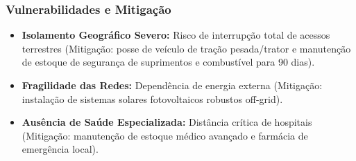 \subsubsection{Vulnerabilidades e
Mitigação}

\begin{itemize}
\tightlist
\item
  \textbf{Isolamento Geográfico Severo:} Risco de interrupção total de
  acessos terrestres (Mitigação: posse de veículo de tração
  pesada/\allowbreak trator e manutenção de estoque de segurança de suprimentos e
  combustível para 90 dias).
\item
  \textbf{Fragilidade das Redes:} Dependência de energia externa
  (Mitigação: instalação de sistemas solares fotovoltaicos robustos
  off-grid).
\item
  \textbf{Ausência de Saúde Especializada:} Distância crítica de
  hospitais (Mitigação: manutenção de estoque médico avançado e farmácia
  de emergência local).
\end{itemize}


